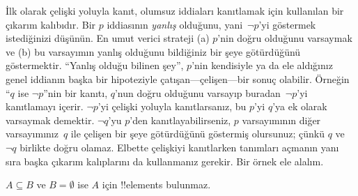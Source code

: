 



İlk olarak çelişki yoluyla kanıt, olumsuz iddiaları kanıtlamak için
kullanılan bir çıkarım kalıbıdır. Bir $p$ iddiasının \emph{yanlış}
olduğunu, yani~$\lnot p$'yi göstermek istediğinizi düşünün. En umut
verici strateji (a) $p$'nin doğru olduğunu varsaymak ve (b) bu
varsayımın yanlış olduğunu bildiğiniz bir şeye götürdüğünü göstermektir.
``Yanlış olduğu bilinen şey'', $p$'nin kendisiyle ya da ele aldığınız
genel iddianın başka bir hipoteziyle çatışan---çelişen---bir sonuç
  olabilir. Örneğin ``$q$ ise $\lnot p$''nin bir kanıtı, $q$'nun doğru
  olduğunu varsayıp buradan~$\lnot p$'yi kanıtlamayı içerir. $\lnot p$'yi
  çelişki yoluyla kanıtlarsanız, bu $p$'yi $q$'ya ek olarak varsaymak
  demektir. $\lnot q$'yu $p$'den kanıtlayabilirseniz, $p$ varsayımının
diğer varsayımınız~$q$ ile çelişen bir şeye götürdüğünü göstermiş
olursunuz; çünkü $q$ ve $\lnot q$ birlikte doğru olamaz. Elbette
çelişkiyi kanıtlarken tanımları açmanın yanı sıra başka çıkarım
kalıplarını da kullanmanız gerekir. Bir örnek ele alalım.

\begin{prop}
  $A \subseteq B$ ve $B = \emptyset$ ise $A$ için !!{element}s
  bulunmaz.
\end{prop}

